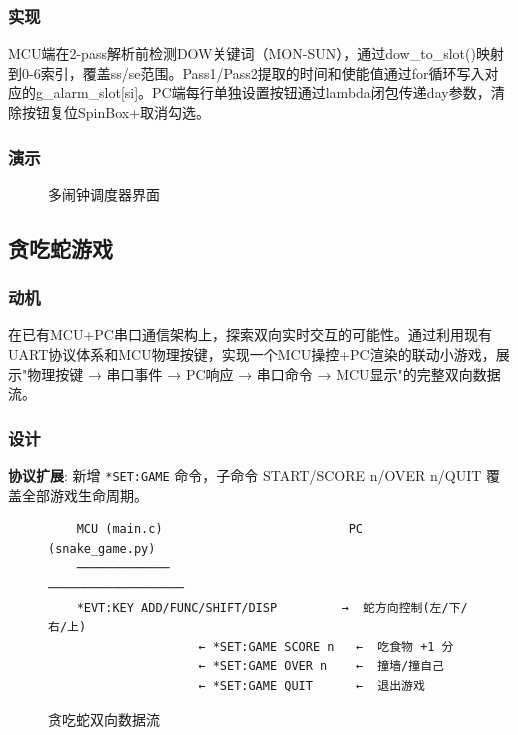 \documentclass[12pt,hyperref,a4paper,UTF8]{ctexart}
\begin{document}
\subsubsection{实现}

MCU端在2-pass解析前检测DOW关键词（MON-SUN），通过dow\_to\_slot()映射到0-6索引，覆盖ss/se范围。Pass1/Pass2提取的时间和使能值通过for循环写入对应的g\_alarm\_slot[si]。PC端每行单独设置按钮通过lambda闭包传递day参数，清除按钮复位SpinBox+取消勾选。

\subsubsection{演示}

\begin{figure}[!htbp]
    \centering
    \caption{多闹钟调度器界面}
    \label{fig:alarm_multi}
\end{figure}

\subsection{贪吃蛇游戏}

\subsubsection{动机}

在已有MCU+PC串口通信架构上，探索双向实时交互的可能性。通过利用现有UART协议体系和MCU物理按键，实现一个MCU操控+PC渲染的联动小游戏，展示"物理按键 → 串口事件 → PC响应 → 串口命令 → MCU显示"的完整双向数据流。

\subsubsection{设计}

\textbf{协议扩展}: 新增 \texttt{*SET:GAME} 命令，子命令 START/SCORE n/OVER n/QUIT 覆盖全部游戏生命周期。

\begin{figure}[!htbp]
    \centering
    \begin{verbatim}
    MCU (main.c)                          PC (snake_game.py)
    ─────────────                         ───────────────────
    *EVT:KEY ADD/FUNC/SHIFT/DISP         →  蛇方向控制(左/下/右/上)
                     ← *SET:GAME SCORE n   ←  吃食物 +1 分
                     ← *SET:GAME OVER n    ←  撞墙/撞自己
                     ← *SET:GAME QUIT      ←  退出游戏
    \end{verbatim}
    \caption{贪吃蛇双向数据流}
\end{figure}
\end{document}
